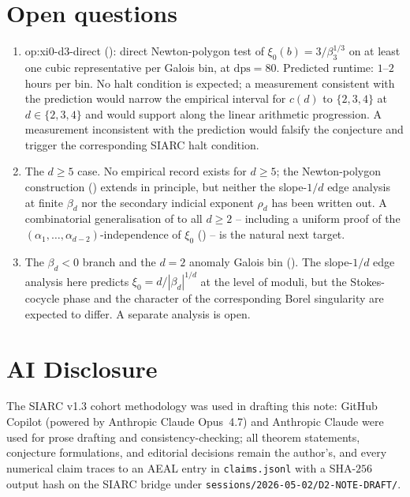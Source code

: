 \documentclass[11pt,reqno]{amsart}
\theoremstyle{plain}
\theoremstyle{definition}
\theoremstyle{remark}
\newcommand{\dps}{\mathrm{dps}}
\begin{document}
\section{Open questions}
\label{sec:open}

\begin{enumerate}[label=(\alph*),leftmargin=2.2em]

\item \textsf{op:xi0-d3-direct}
(\cite[\S9]{siarc_channel_theory_v13}): direct
Newton-polygon test of $\xi_0(b) = 3/\beta_3^{1/3}$ on at
least one cubic representative per Galois bin, at
$\dps = 80$. Predicted runtime: $1$--$2$ hours per bin. No
halt condition is expected; a measurement consistent with
the prediction would narrow the empirical interval for
$c(d)$ to $\{2, 3, 4\}$ at $d \in \{2, 3, 4\}$ and would
support  along the linear arithmetic
progression. A measurement inconsistent with the prediction
would falsify the conjecture and trigger the corresponding
SIARC halt condition.

\item The $d \ge 5$ case. No empirical record exists for
$d \ge 5$; the Newton-polygon construction
() extends in principle, but neither
the slope-$1/d$ edge analysis at finite $\beta_d$ nor the
secondary indicial exponent $\rho_d$ has been written out.
A combinatorial generalisation of  to all
$d \ge 2$ -- including a uniform proof of the
$(\alpha_1, \dots, \alpha_{d-2})$-independence of $\xi_0$
() -- is the natural next
target.

\item The $\beta_d < 0$ branch and the $d = 2$ anomaly
Galois bin
(\cite[Remark~5.E]{siarc_pcf1_v13}). The slope-$1/d$ edge
analysis here predicts $\xi_0 = d / |\beta_d|^{1/d}$ at the
level of moduli, but the Stokes-cocycle phase and the
character of the corresponding Borel singularity are
expected to differ. A separate analysis is open.

\end{enumerate}

\section*{AI Disclosure}

The SIARC v1.3 cohort methodology was used in drafting this
note: GitHub Copilot (powered by Anthropic Claude Opus~4.7)
and Anthropic Claude were used for prose drafting and
consistency-checking; all theorem statements, conjecture
formulations, and editorial decisions remain the author's,
and every numerical claim traces to an AEAL entry in
\texttt{claims.jsonl} with a SHA-$256$ output hash on the
SIARC bridge under \texttt{sessions/2026-05-02/D2-NOTE-DRAFT/}.



\end{document}
